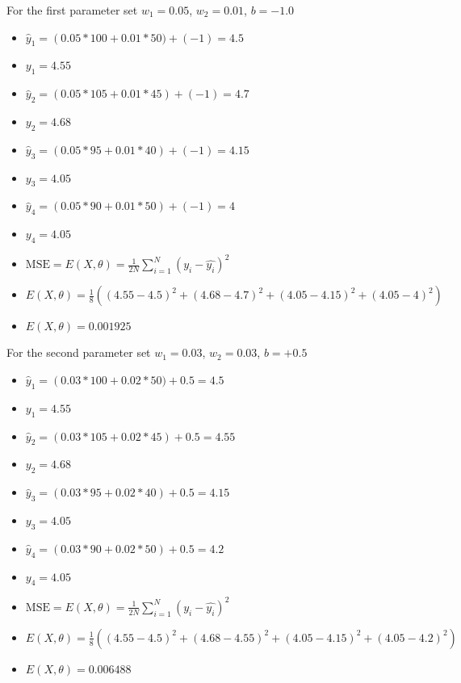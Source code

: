 \documentclass[main.tex]{subfiles}
\begin{document}
\begin{enumerate}
        For the first parameter set $w_1=0.05$, $w_2=0.01$, $b=-1.0$
        
        \begin{itemize}[label={}]
            \item $\hat{y}_1 = \left(0.05*100+0.01*50)+(-1) = 4.5$
            \item ${y}_1 = 4.55$
            \item $\hat{y}_2 = \left(0.05*105+0.01*45\right)+(-1) = 4.7$
            \item ${y}_2 = 4.68$
            \item $\hat{y}_3 = \left(0.05*95+0.01*40\right)+(-1) = 4.15$
            \item ${y}_3 = 4.05$
            \item $\hat{y}_4 = \left(0.05*90+0.01*50\right)+(-1) = 4$
            \item ${y}_4 = 4.05$
            \item $\text{MSE} = E(X,\theta) = \frac{1}{2N}\sum_{i=1}^{N}\left(y_i-\hat{y_i}\right)^2$
            \item $E(X,\theta) = \frac{1}{8}\left(\left (4.55-4.5\right)^2+\left(4.68-4.7\right)^2+\left(4.05-4.15\right)^2+\left(4.05-4\right)^2\right)$
            \item $E(X,\theta) = 0.001925$
        \end{itemize}
        
        For the second parameter set $w_1=0.03$, $w_2=0.03$, $b=+0.5$
        
        \begin{itemize}[label={}]
            \item $\hat{y}_1 = \left(0.03*100+0.02*50)+0.5 = 4.5$
            \item ${y}_1 = 4.55$
            \item $\hat{y}_2 = \left(0.03*105+0.02*45\right)+0.5 = 4.55$
            \item ${y}_2 = 4.68$
            \item $\hat{y}_3 = \left(0.03*95+0.02*40\right)+0.5 = 4.15$
            \item ${y}_3 = 4.05$
            \item $\hat{y}_4 = \left(0.03*90+0.02*50\right)+0.5 = 4.2$
            \item ${y}_4 = 4.05$
            \item $\text{MSE} = E(X,\theta) = \frac{1}{2N}\sum_{i=1}^{N}\left(y_i-\hat{y_i}\right)^2$
            \item $E(X,\theta) = \frac{1}{8}\left(\left (4.55-4.5\right)^2+\left(4.68-4.55\right)^2+\left(4.05-4.15\right)^2+\left(4.05-4.2\right)^2\right)$
            \item $E(X,\theta) = 0.006488$
        \end{itemize}
        

\end{enumerate}
\end{document}
